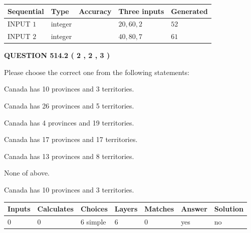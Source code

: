 \documentclass[12pt]{article}
\begin{document}
   
  
  
\noindent\begin{tabular}{|l|l|l|l|l|}
\hline
 Sequential & Type & Accuracy & Three inputs & Generated \\ 
\hline
 
 
  INPUT $  1 $ & integer &  & $
 20
 , 
 60
 , 
 2
 $ & $ 52 $ 
 \\  \hline  
 
 
  INPUT $  2 $ & integer &  & $
 40
 , 
 80
 , 
 7
 $ & $ 61 $ 
 \\  \hline  
 \end{tabular}
   
   
  
\vspace{0.2in}
  
{\textbf{\Large{QUESTION
514.2 
 ( 2 , 2 , 3 )
}}}
  
  
Please choose the correct one from the following statements:
 
 
Canada has 10  provinces and 3 territories.
 
 
Canada has  26 provinces and  5 territories.
 
 
Canada has   4 provinces and  19 territories.
 
 
Canada has  17 provinces and  17 territories.
 
 
Canada has  13 provinces and  8 territories.
 
 
 None of above.
 
 
\noindent{}
 
 
Canada has 10  provinces and 3 territories.
 
 
\noindent{}
 
 
   
   
   
   
\noindent\begin{tabular}{|l|l|l|l|l|l|l|}
 \hline
Inputs & Calculates & Choices & Layers & Matches & Answer & Solution \\ \hline
 0  & 
 0  & 
 6
  simple  
  & 
 6  & 
 0  & 
  yes & 
  no 
  \\ \hline
 \end{tabular}
   
\end{document}
